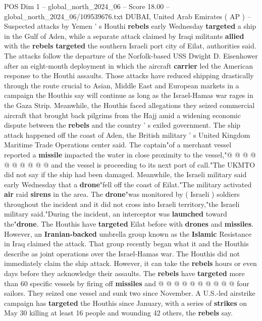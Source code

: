 \begin{textsample}{POS Dim 1 – global\_north\_2024\_06 – Score 18.00 – global\_north\_2024\_06/109539676.txt}  \label{ex:f1_pos_318}
DUBAI, United Arab Emirates ( AP ) -- Suspected attacks by Yemen ' s Houthi \textbf{rebels} early Wednesday \textbf{targeted} a ship in the Gulf of Aden, while a separate attack claimed by Iraqi militants \textbf{allied} with the \textbf{rebels} \textbf{targeted} the southern Israeli port city of Eilat, authorities said.
The attacks follow the departure of the Norfolk-based USS Dwight D.
Eisenhower after an eight-month deployment in which the aircraft \textbf{carrier} led the American response to the Houthi assaults.
Those attacks have reduced shipping drastically through the route crucial to Asian, Middle East and European markets in a campaign the Houthis say will continue as long as the Israel-Hamas war rages in the Gaza Strip.
Meanwhile, the Houthis faced allegations they seized commercial aircraft that brought back pilgrims from the Hajj amid a widening economic dispute between the \textbf{rebels} and the country ' s exiled government.
The ship attack happened off the coast of Aden, the British military ' s United Kingdom Maritime Trade Operations center said.
The captain"of a merchant vessel reported a \textbf{missile} impacted the water in close proximity to the vessel,"@ @ @ @ @ @ @ @ @ @ and the vessel is proceeding to its next port of call."The UKMTO did not say if the ship had been damaged.
Meanwhile, the Israeli military said early Wednesday that a \textbf{drone}"fell off the coast of Eilat."The military activated \textbf{air} raid \textbf{sirens} in the area.
The \textbf{drone}"was monitored by ( Israeli ) soldiers throughout the incident and it did not cross into Israeli territory,"the Israeli military said."During the incident, an interceptor was \textbf{launched} toward the"\textbf{drone}.
The Houthis have \textbf{targeted} Eilat before with \textbf{drones} and \textbf{missiles}.
However, an \textbf{Iranian-backed} umbrella group known as the \textbf{Islamic} Resistance in Iraq claimed the attack.
That group recently began what it and the Houthis describe as joint operations over the Israel-Hamas war.
The Houthis did not immediately claim the ship attack.
However, it can take the \textbf{rebels} hours or even days before they acknowledge their assaults.
The \textbf{rebels} have \textbf{targeted} more than 60 specific vessels by firing off \textbf{missiles} and @ @ @ @ @ @ @ @ @ @ four sailors.
They seized one vessel and sunk two since November.
A U.S.-led airstrike campaign has \textbf{targeted} the Houthis since January, with a series of \textbf{strikes} on May 30 killing at least 16 people and wounding 42 others, the \textbf{rebels} say.

\end{textsample}

